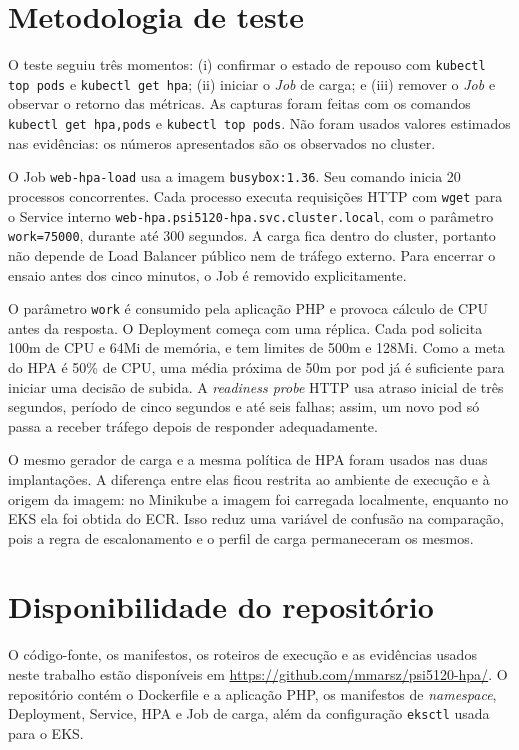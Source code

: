 \documentclass[conference]{IEEEtran}
\begin{document}
\section{Metodologia de teste}
O teste seguiu três momentos: (i) confirmar o estado de repouso com \texttt{kubectl top pods} e \texttt{kubectl get hpa}; (ii) iniciar o \textit{Job} de carga; e (iii) remover o \textit{Job} e observar o retorno das métricas. As capturas foram feitas com os comandos \texttt{kubectl get hpa,pods} e \texttt{kubectl top pods}. Não foram usados valores estimados nas evidências: os números apresentados são os observados no cluster.

O Job \texttt{web-hpa-load} usa a imagem \texttt{busybox:1.36}. Seu comando inicia 20 processos concorrentes. Cada processo executa requisições HTTP com \texttt{wget} para o Service interno \texttt{web-hpa.psi5120-hpa.svc.cluster.local}, com o parâmetro \texttt{work=75000}, durante até 300 segundos. A carga fica dentro do cluster, portanto não depende de Load Balancer público nem de tráfego externo. Para encerrar o ensaio antes dos cinco minutos, o Job é removido explicitamente.

O parâmetro \texttt{work} é consumido pela aplicação PHP e provoca cálculo de CPU antes da resposta. O Deployment começa com uma réplica. Cada pod solicita 100m de CPU e 64Mi de memória, e tem limites de 500m e 128Mi. Como a meta do HPA é 50\% de CPU, uma média próxima de 50m por pod já é suficiente para iniciar uma decisão de subida. A \textit{readiness probe} HTTP usa atraso inicial de três segundos, período de cinco segundos e até seis falhas; assim, um novo pod só passa a receber tráfego depois de responder adequadamente.

O mesmo gerador de carga e a mesma política de HPA foram usados nas duas implantações. A diferença entre elas ficou restrita ao ambiente de execução e à origem da imagem: no Minikube a imagem foi carregada localmente, enquanto no EKS ela foi obtida do ECR. Isso reduz uma variável de confusão na comparação, pois a regra de escalonamento e o perfil de carga permaneceram os mesmos.

\section{Disponibilidade do repositório}
O código-fonte, os manifestos, os roteiros de execução e as evidências usados neste trabalho estão disponíveis em \url{https://github.com/mmarsz/psi5120-hpa/}. O repositório contém o Dockerfile e a aplicação PHP, os manifestos de \textit{namespace}, Deployment, Service, HPA e Job de carga, além da configuração \texttt{eksctl} usada para o EKS.
\end{document}
